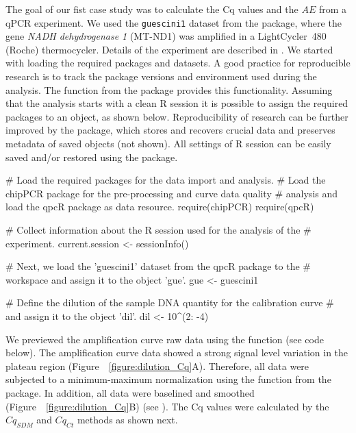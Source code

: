 The goal of our fist case study was to calculate the Cq values and the $AE$ from 
a qPCR experiment. We used the \texttt{guescini1} dataset from the  
package, where the gene \textit{NADH dehydrogenase 1} (MT-ND1) was amplified in 
a LightCycler\circledR~480 (Roche) thermocycler. Details of the experiment are 
described in \citet{guescini_2008}. We started with loading the required 
packages and datasets. A good practice for reproducible research is to track the 
package versions and environment used during the analysis. The function 
 from the  package provides this functionality. 
Assuming that the analysis starts with a clean R session it is possible to 
assign the required packages to an object, as shown below. Reproducibility 
of research can be further improved by the  package, which 
stores and recovers crucial data and preserves metadata of saved objects (not 
shown). All settings of R session can be easily saved and/or restored using 
the  package.

\begin{example}
# Load the required packages for the data import and analysis.
# Load the chipPCR package for the pre-processing and curve data quality
# analysis and load the qpcR package as data resource.
require(chipPCR)
require(qpcR)

# Collect information about the R session used for the analysis of the
# experiment.
current.session <- sessionInfo()

# Next, we load the 'guescini1' dataset from the qpcR package to the
# workspace and assign it to the object 'gue'.
gue <- guescini1

# Define the dilution of the sample DNA quantity for the calibration curve 
# and assign it to the object 'dil'.
dil <- 10^(2: -4)
\end{example}

We previewed the amplification curve raw data using the  function 
(see code below). The amplification curve data showed a strong signal level 
variation in the plateau region (Figure~~\ref{figure:dilution_Cq}A). Therefore, 
all data were subjected to a minimum-maximum normalization using the  
function from the  package. In addition, all data were baselined and 
smoothed (Figure~~\ref{figure:dilution_Cq}B) (see \citet{roediger_RJ_2013, 
roediger_2015_Bioinformatics}). The Cq values were calculated by 
the $Cq_{SDM}$ and $Cq_{Ct}$ methods as shown next.

